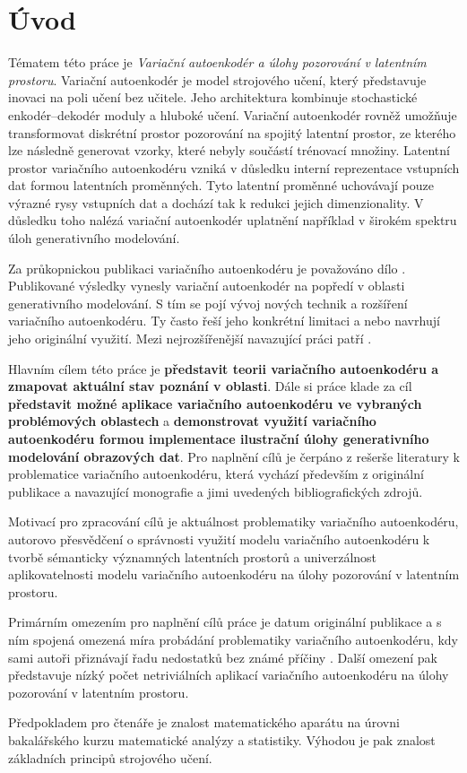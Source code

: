 \chapter*{Úvod}
Tématem této práce je \emph{Variační autoenkodér a úlohy pozorování v latentním prostoru}.
Variační autoenkodér je model strojového učení, který představuje inovaci na poli učení bez učitele.
Jeho architektura kombinuje stochastické enkodér–dekodér moduly a hluboké učení.
Variační autoenkodér rovněž umožňuje transformovat diskrétní prostor pozorování na spojitý latentní prostor, ze kterého lze následně generovat vzorky, které nebyly součástí trénovací množiny.
Latentní prostor variačního autoenkodéru vzniká v důsledku interní reprezentace vstupních dat formou latentních proměnných.
Tyto latentní proměnné uchovávají pouze výrazné rysy vstupních dat a dochází tak k redukci jejich dimenzionality.
V důsledku toho nalézá variační autoenkodér uplatnění například v širokém spektru úloh generativního modelování.

Za průkopnickou publikaci variačního autoenkodéru je považováno dílo \textcite{Kingma2014}.
Publikované výsledky vynesly variační autoenkodér na popředí v oblasti generativního modelování.
S tím se pojí vývoj nových technik a rozšíření variačního autoenkodéru.
Ty často řeší jeho konkrétní limitaci a nebo navrhují jeho originální využití.
Mezi nejrozšířenější navazující práci patří \textcite{Sohn2015}.

Hlavním cílem této práce je \textbf{představit teorii variačního autoenkodéru a zmapovat aktuální stav poznání v oblasti}.
Dále si práce klade za cíl \textbf{představit možné aplikace variačního autoenkodéru ve vybraných problémových oblastech} a \textbf{demonstrovat využití variačního autoenkodéru formou implementace ilustrační úlohy generativního modelování obrazových dat}.
Pro naplnění cílů je čerpáno z rešerše literatury k problematice variačního autoenkodéru, která vychází především z originální publikace \textcite{Kingma2014} a navazující monografie \textcite{Kingma2019} a jimi uvedených bibliografických zdrojů.

Motivací pro zpracování cílů je aktuálnost problematiky variačního autoenkodéru, autorovo přesvědčení o správnosti využití modelu variačního autoenkodéru k tvorbě sémanticky významných latentních prostorů a univerzálnost aplikovatelnosti modelu variačního autoenkodéru na úlohy pozorování v latentním prostoru.

Primárním omezením pro naplnění cílů práce je datum originální publikace a s ním spojená omezená míra probádání problematiky variačního autoenkodéru, kdy sami autoři přiznávají řadu nedostatků bez známé příčiny \cite{Kingma2019}.
Další omezení pak představuje nízký počet netriviálních aplikací variačního autoenkodéru na úlohy pozorování v latentním prostoru.

Předpokladem pro čtenáře je znalost matematického aparátu na úrovni bakalářského kurzu matematické analýzy a statistiky.
Výhodou je pak znalost základních principů strojového učení.